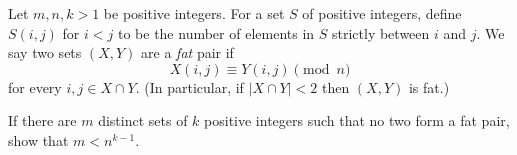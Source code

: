 Let $m, n, k > 1$ be positive integers.  For a set $S$ of positive integers, define $S(i,j)$ for $i<j$ to be the number of elements in $S$ strictly between $i$ and $j$.  We say two sets $(X,Y)$ are a \emph{fat} pair if \[ X(i,j)\equiv Y(i,j) \pmod{n} \] for every $i,j \in X \cap Y$.  (In particular, if $\left\lvert X \cap Y \right\rvert < 2$ then $(X,Y)$ is fat.)

If there are $m$ distinct sets of $k$ positive integers such that no two form a fat pair, show that $m<n^{k-1}$.